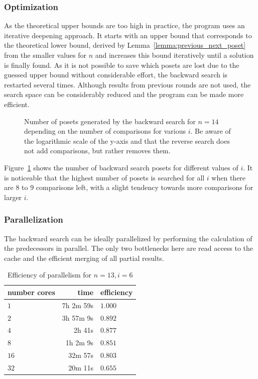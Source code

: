\documentclass[10pt,journal,compsoc]{IEEEtran}
\begin{document}
\subsubsection{Optimization}

As the theoretical upper bounds are too high in practice, the program uses an iterative deepening approach.
It starts with an upper bound that corresponds to the theoretical lower bound, derived by Lemma~\ref{lemma:previous_next_poset} from the smaller values for $n$ and increases this bound iteratively until a solution is finally found.
As it is not possible to save which posets are lost due to the guessed upper bound without considerable effort, the backward search is restarted several times.
Although results from previous rounds are not used, the search space can be considerably reduced and the program can be made more efficient.

\begin{figure}[!b]
  \centering
  
  \caption{Number of posets generated by the backward search for $n = 14$ depending on the number of comparisons for various $i$. Be aware of the logarithmic scale of the y-axis and that the reverse search does not add comparisons, but rather removes them.}
  \label{fig:backward-posets-per-level}
\end{figure}

Figure~\ref{fig:backward-posets-per-level} shows the number of backward search posets for different values of $i$.
It is noticeable that the highest number of posets is searched for all $i$ when there are $8$ to $9$ comparisons left, with a slight tendency towards more comparisons for larger $i$.


\subsubsection{Parallelization} \label{sec:backward:parallelisation}

The backward search can be ideally parallelized by performing the calculation of the predecessors in parallel.
The only two bottlenecks here are read access to the cache and the efficient merging of all partial results.

\begin{table}[!t]
  \renewcommand{\arraystretch}{1.2}
  \caption{Efficiency of parallelism for $n = 13, i = 6$}
  \label{table:backward-parallel}
  \centering
  \begin{tabular}{l|r|l}
    number cores & time      & efficiency \\
    \hline
    $1$          & 7h 2m 59s & $1.000$    \\
    $2$          & 3h 57m 9s & $0.892$    \\
    $4$          & 2h 41s    & $0.877$    \\
    $8$          & 1h 2m 9s  & $0.851$    \\
    $16$         & 32m 57s   & $0.803$    \\
    $32$         & 20m 11s   & $0.655$    \\
  \end{tabular}
\end{table}
\end{document}
